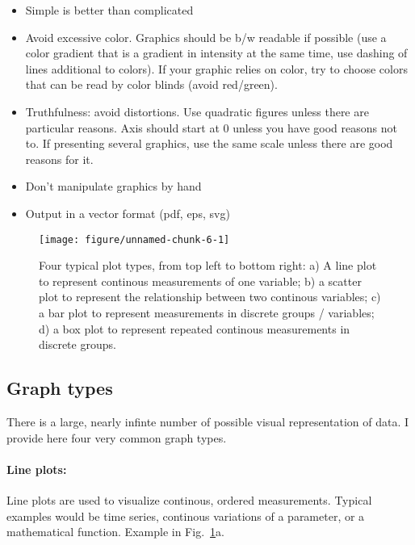 \documentclass[a4paper,twoside]{tufte-book}\usepackage[]{graphicx}\usepackage[]{color}
\makeatletter
\def\maxwidth{ %
  \ifdim\Gin@nat@width>\linewidth
    \linewidth
  \else
    \Gin@nat@width
  \fi
}
\makeatother
\begin{document}
{\begin{itemize}
\item Simple is better than complicated
\item Avoid excessive color. Graphics should be b/w readable if possible (use a color gradient that is a gradient in intensity at the same time, use dashing of lines additional to colors). If your graphic relies on color, try to choose colors that can be read by color blinds (avoid red/green).
\item Truthfulness: avoid distortions. Use quadratic figures unless there are particular reasons. Axis should start at 0 unless you have good reasons not to. If presenting several graphics, use the same scale unless there are good reasons for it. 
\item Don't manipulate graphics by hand
\item Output in a vector format (pdf, eps, svg)
\end{itemize}

\begin{figure}[htbp]
\begin{center}

\begin{Schunk}

\texttt{[image: figure/unnamed-chunk-6-1]} \end{Schunk}
\caption{Four typical plot types, from top left to bottom right: a) A line plot to represent continous measurements of one variable; b) a scatter plot to represent the relationship between two continous variables; c) a bar plot to represent measurements in discrete groups / variables; d) a box plot to represent repeated continous measurements in discrete groups.}
\label{fig: exaple plots}
\end{center}
\end{figure}


\subsection{Graph types}

There is a large, nearly infinte number of possible visual representation of data. I provide here four very common graph types. 

\paragraph{Line plots:} Line plots are used to visualize continous, ordered measurements. Typical examples would be time series, continous variations of a parameter, or a mathematical function. Example in Fig.~\ref{fig: exaple plots}a.

}
\end{document}

